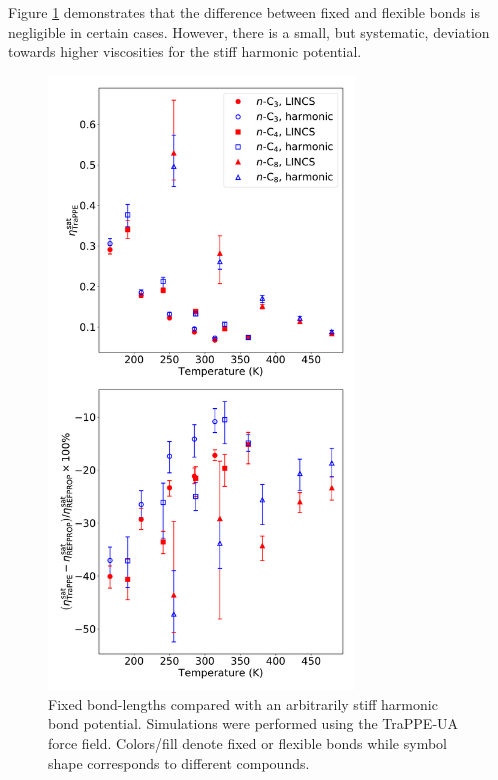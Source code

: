 \documentclass[preprint,review,12pt]{elsarticle}
\begin{document}
    Figure \ref{fig:fixed_flexible} demonstrates that the difference between fixed and flexible bonds is negligible in certain cases. However, there is a small, but systematic, deviation towards higher viscosities for the stiff harmonic potential. 
    

	\begin{figure}[htb!]
		\centering
		\includegraphics[width=3.2in]{nAlkanes_TraPPE_BondType.pdf}
		\caption{Fixed bond-lengths compared with an arbitrarily stiff harmonic bond potential. Simulations were performed using the TraPPE-UA force field. Colors/fill denote fixed or flexible bonds while symbol shape corresponds to different compounds.}
		\label{fig:fixed_flexible}
	\end{figure} 
\end{document}
